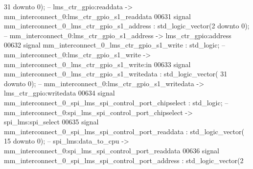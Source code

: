 \begin{DoxyCode}
{      31} \textcolor{keywordflow}{downto} \textcolor{vhdllogic}{}\textcolor{vhdllogic}{0}\textcolor{vhdlchar}{)};\textcolor{keyword}{ -- lms\_ctr\_gpio:readdata -> mm\_interconnect\_0:lms\_ctr\_gpio\_s1\_readdata}
00631     \textcolor{keywordflow}{signal} \textcolor{vhdlchar}{mm_interconnect_0_lms_ctr_gpio_s1_address}                                   \textcolor{vhdlchar}{:} \textcolor{comment}{std\_logic\_vector}\textcolor{vhdlchar}{(}\textcolor{vhdllogic}{}\textcolor{vhdllogic}{2}
       \textcolor{keywordflow}{downto} \textcolor{vhdllogic}{}\textcolor{vhdllogic}{0}\textcolor{vhdlchar}{)};\textcolor{keyword}{  -- mm\_interconnect\_0:lms\_ctr\_gpio\_s1\_address -> lms\_ctr\_gpio:address}
00632     \textcolor{keywordflow}{signal} \textcolor{vhdlchar}{mm_interconnect_0_lms_ctr_gpio_s1_write}                                     \textcolor{vhdlchar}{:} \textcolor{comment}{std\_logic};\textcolor{keyword}{        
                   -- mm\_interconnect\_0:lms\_ctr\_gpio\_s1\_write -> mm\_interconnect\_0\_lms\_ctr\_gpio\_s1\_write:in}
00633     \textcolor{keywordflow}{signal} \textcolor{vhdlchar}{mm_interconnect_0_lms_ctr_gpio_s1_writedata}                                 \textcolor{vhdlchar}{:} \textcolor{comment}{std\_logic\_vector}\textcolor{vhdlchar}{(}\textcolor{vhdllogic}{}\textcolor{vhdllogic}{
      31} \textcolor{keywordflow}{downto} \textcolor{vhdllogic}{}\textcolor{vhdllogic}{0}\textcolor{vhdlchar}{)};\textcolor{keyword}{ -- mm\_interconnect\_0:lms\_ctr\_gpio\_s1\_writedata -> lms\_ctr\_gpio:writedata}
00634     \textcolor{keywordflow}{signal} \textcolor{vhdlchar}{mm_interconnect_0_spi_lms_spi_control_port_chipselect}                       \textcolor{vhdlchar}{:} \textcolor{comment}{std\_logic};\textcolor{keyword}{        
                   -- mm\_interconnect\_0:spi\_lms\_spi\_control\_port\_chipselect -> spi\_lms:spi\_select}
00635     \textcolor{keywordflow}{signal} \textcolor{vhdlchar}{mm_interconnect_0_spi_lms_spi_control_port_readdata}                         \textcolor{vhdlchar}{:} \textcolor{comment}{std\_logic\_vector}\textcolor{vhdlchar}{(}\textcolor{vhdllogic}{}\textcolor{vhdllogic}{
      15} \textcolor{keywordflow}{downto} \textcolor{vhdllogic}{}\textcolor{vhdllogic}{0}\textcolor{vhdlchar}{)};\textcolor{keyword}{ -- spi\_lms:data\_to\_cpu -> mm\_interconnect\_0:spi\_lms\_spi\_control\_port\_readdata}
00636     \textcolor{keywordflow}{signal} \textcolor{vhdlchar}{mm_interconnect_0_spi_lms_spi_control_port_address}                          \textcolor{vhdlchar}{:} \textcolor{comment}{std\_logic\_vector}\textcolor{vhdlchar}{(}\textcolor{vhdllogic}{}\textcolor{vhdllogic}{2}

\end{DoxyCode}
